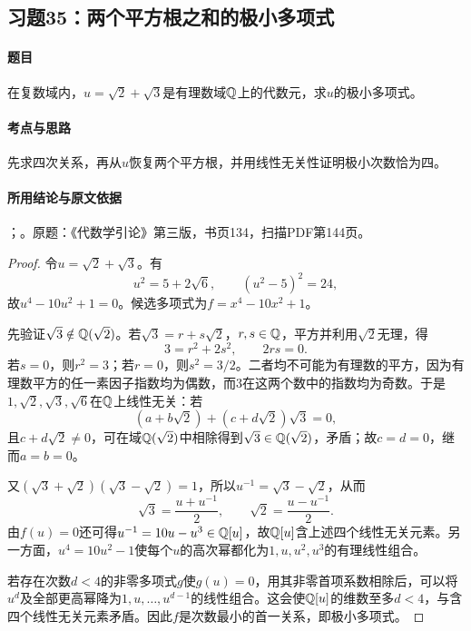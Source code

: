 \subsection{习题35：两个平方根之和的极小多项式}

\label{ex:3:35}

\paragraph{题目}

在复数域内，$u=\sqrt2+\sqrt3$是有理数域$\mathbb Q$上的代数元，求$u$的极小多项式。

\paragraph{考点与思路}

先求四次关系，再从$u$恢复两个平方根，并用线性无关性证明极小次数恰为四。

\paragraph{所用结论与原文依据}

；。原题：《代数学引论》第三版，书页134，扫描PDF第144页。


\begin{proof}

令$u=\sqrt2+\sqrt3$。有
\[
u^2=5+2\sqrt6,\qquad (u^2-5)^2=24,
\]
故$u^4-10u^2+1=0$。候选多项式为$f=x^4-10x^2+1$。

先验证$\sqrt3\notin\mathbb Q(\sqrt2)$。若$\sqrt3=r+s\sqrt2$，$r,s\in\mathbb Q$，平方并利用$\sqrt2$无理，得
\[
3=r^2+2s^2,
\qquad 2rs=0.
\]
若$s=0$，则$r^2=3$；若$r=0$，则$s^2=3/2$。二者均不可能为有理数的平方，因为有理数平方的任一素因子指数均为偶数，而$3$在这两个数中的指数均为奇数。于是$1,\sqrt2,\sqrt3,\sqrt6$在$\mathbb Q$上线性无关：若
\[
(a+b\sqrt2)+(c+d\sqrt2)\sqrt3=0,
\]
且$c+d\sqrt2\ne0$，可在域$\mathbb Q(\sqrt2)$中相除得到$\sqrt3\in\mathbb Q(\sqrt2)$，矛盾；故$c=d=0$，继而$a=b=0$。

又$(\sqrt3+\sqrt2)(\sqrt3-\sqrt2)=1$，所以$u^{-1}=\sqrt3-\sqrt2$，从而
\[
\sqrt3=\frac{u+u^{-1}}2,\qquad
\sqrt2=\frac{u-u^{-1}}2.
\]
由$f(u)=0$还可得$u^{-1}=10u-u^3\in\mathbb Q[u]$，故$\mathbb Q[u]$含上述四个线性无关元素。另一方面，$u^4=10u^2-1$使每个$u$的高次幂都化为$1,u,u^2,u^3$的有理线性组合。

若存在次数$d<4$的非零多项式$g$使$g(u)=0$，用其非零首项系数相除后，可以将$u^d$及全部更高幂降为$1,u,\ldots,u^{d-1}$的线性组合。这会使$\mathbb Q[u]$的维数至多$d<4$，与含四个线性无关元素矛盾。因此$f$是次数最小的首一关系，即极小多项式。

\end{proof}

